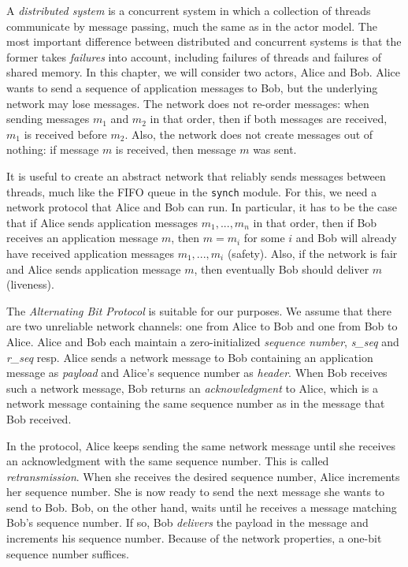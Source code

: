 \documentclass{report}
\begin{document}
A
\emph{distributed system}
%
is a concurrent system in which a collection
of threads communicate by message passing, much the same as
in the actor model.
The most important difference between distributed and concurrent
systems is that the former takes \emph{failures}
%
into account,
including failures of threads and failures of shared memory.
In this chapter, we will consider two actors, Alice and Bob.
Alice wants to send a sequence of application messages to Bob,
but the underlying network may lose messages.
%
The network does not re-order messages: when sending messages
$m_1$ and $m_2$ in that order, then if both messages are received,
$m_1$ is received before $m_2$.
Also, the network does not create messages out of nothing: if
message $m$ is received, then message $m$ was sent.

It is useful to create an abstract network that reliably sends messages
between threads, much like the FIFO queue in the \texttt{synch} module.
For this, we need a network protocol that Alice and Bob can run.
In particular, it has to be the case that if Alice sends application
messages $m_1, ..., m_n$ in that order, then if Bob receives an
application message
$m$, then $m = m_i$ for some $i$ and Bob will already have received
application messages $m_1, ..., m_i$ (safety).
Also, if the network is fair and Alice sends application message
$m$, then eventually Bob should deliver $m$ (liveness).

The \emph{Alternating Bit Protocol} is suitable for our purposes.
We assume that there are two unreliable network channels: one from Alice
to Bob and one from Bob to Alice.
Alice and Bob each maintain a zero-initialized
\emph{sequence number},
%
\textit{s\_seq} and \textit{r\_seq} resp.
Alice sends a network message to Bob containing an
application message as \emph{payload} and Alice's sequence number
as \emph{header}.
When Bob receives such a network message, Bob returns an
\emph{acknowledgment}
%
to Alice, which is a network message
containing the same sequence number as in the message that Bob received.

In the protocol, Alice keeps sending the same network message until she
receives an acknowledgment with the same sequence number.
This is called \emph{retransmission}.
%
When she receives the desired sequence number, Alice increments her sequence number.
She is now ready to send the next message she wants to send to Bob.
Bob, on the other hand, waits until he receives a message matching
Bob's sequence number.  If so, Bob \emph{delivers} the payload in the
message and increments his sequence number.
Because of the network properties,  a one-bit sequence number suffices.
\end{document}
